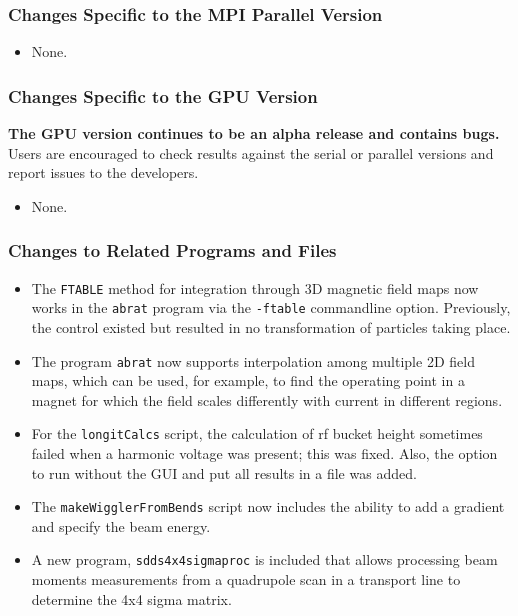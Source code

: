 \documentclass[11pt]{article}
\begin{document}
\subsubsection{Changes Specific to the MPI Parallel Version}

\begin{itemize}
\item None.
\end{itemize}

\subsubsection{Changes Specific to the GPU Version}

{\bf The GPU version continues to be an alpha release and contains bugs.}
Users are encouraged to check results against the serial or parallel versions and report issues to the developers.

\begin{itemize}
\item None.
\end{itemize}

\subsubsection{Changes to Related Programs and Files}

\begin{itemize}
\item The \verb|FTABLE| method for integration through 3D magnetic field maps now works in the \verb|abrat|
  program via the \verb|-ftable| commandline option. Previously, the control existed but resulted in no transformation
  of particles taking place.
\item The program \verb|abrat| now supports interpolation among multiple 2D field maps, which
  can be used, for example, to find the operating point in a magnet for which the field scales differently with
  current in different regions.
\item For the \verb|longitCalcs| script, the calculation of rf bucket height sometimes failed when a harmonic voltage
  was present; this was fixed. Also, the option to run without the GUI and put all results in a file was added.
\item The \verb|makeWigglerFromBends| script now includes the ability to add a gradient and specify the beam energy.
\item A new program, \verb|sdds4x4sigmaproc| is included that allows processing beam moments measurements from a
  quadrupole scan in a transport line to determine the 4x4 sigma matrix. 
\end{itemize}
\end{document}
